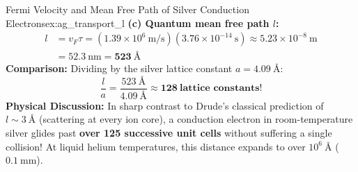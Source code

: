 \documentclass[11pt,a4paper]{article}
\begin{document}
\begin{examplebox}{Fermi Velocity and Mean Free Path of Silver Conduction Electrons}{ex:ag_transport_l}
\textbf{(c) Quantum mean free path $l$:}
\begin{align*}
l &= v_F \tau = (1.39 \times 10^6\ \mathrm{m/s})(3.76 \times 10^{-14}\ \mathrm{s}) \approx 5.23 \times 10^{-8}\ \mathrm{m} \\
&= \mathbf{52.3\ \mathrm{nm} = 523\ \text{\AA}}
\end{align*}
\textbf{Comparison:} Dividing by the silver lattice constant $a = 4.09\ \text{\AA}$:
\[
\frac{l}{a} = \frac{523\ \text{\AA}}{4.09\ \text{\AA}} \approx \mathbf{128\ \text{lattice constants!}}
\]
\textbf{Physical Discussion:} In sharp contrast to Drude's classical prediction of $l \sim 3\ \text{\AA}$ (scattering at every ion core), a conduction electron in room-temperature silver glides past \textbf{over 125 successive unit cells} without suffering a single collision! At liquid helium temperatures, this distance expands to over $10^6\ \text{\AA}$ ($0.1\ \mathrm{mm}$).
\end{examplebox}

\vspace{0.4cm}
\end{document}
